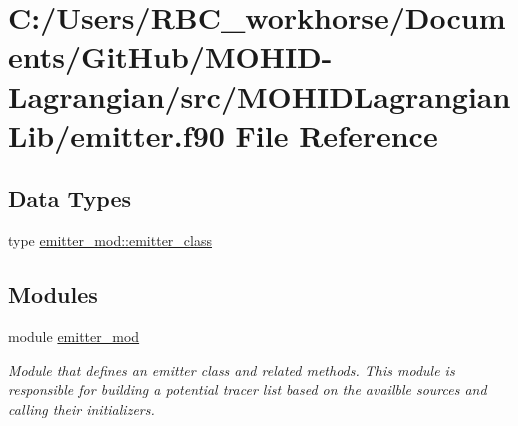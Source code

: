 \hypertarget{emitter_8f90}{}\section{C\+:/\+Users/\+R\+B\+C\+\_\+workhorse/\+Documents/\+Git\+Hub/\+M\+O\+H\+I\+D-\/\+Lagrangian/src/\+M\+O\+H\+I\+D\+Lagrangian\+Lib/emitter.f90 File Reference}
\label{emitter_8f90}
\subsection*{Data Types}
\begin{DoxyCompactItemize}
\item 
type \mbox{\hyperlink{structemitter__mod_1_1emitter__class}{emitter\+\_\+mod\+::emitter\+\_\+class}}
\end{DoxyCompactItemize}
\subsection*{Modules}
\begin{DoxyCompactItemize}
\item 
module \mbox{\hyperlink{namespaceemitter__mod}{emitter\+\_\+mod}}
\begin{DoxyCompactList}\small\item\em Module that defines an emitter class and related methods. This module is responsible for building a potential tracer list based on the availble sources and calling their initializers. \end{DoxyCompactList}\end{DoxyCompactItemize}
